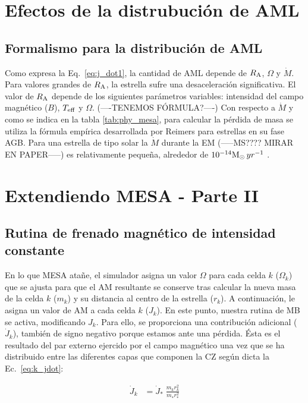 \section{Efectos de la distrubución de AML}
\subsection{Formalismo para la distribución de AML} \label{mod_aml}
Como expresa la Eq.~\ref{eq:j_dot1}, la cantidad de AML depende de $R_{\mathrm{A}}$, $\Omega$ y $\Dot{M}$. Para valores grandes de $R_{\mathrm{A}}$, la estrella sufre una desaceleración significativa. El valor de $R_{\mathrm{A}}$ depende de los siguientes parámetros variables: intensidad del campo magnético ($B$), $T_{\mathrm{eff}}$ y $\Omega$. (----TENEMOS FÓRMULA?----) Con respecto a $\Dot{M}$ y como se indica en la tabla \ref{tab:phy_mesa}, para calcular la pérdida de masa se utiliza la fórmula empírica desarrollada por Reimers \citep{Reimers1975} para estrellas en su fase AGB. Para una estrella de tipo solar la $\Dot{M}$ durante la EM (-----MS???? MIRAR EN PAPER-----) es relativamente pequeña, alrededor de $10^{-14}\mathrm{M}_\odot \, yr^{-1}$ \citep{Noerdlinger2008}. \par


\section{Extendiendo MESA - Parte II}

\subsection{Rutina de frenado magnético de intensidad constante} \label{sec:mb_cte_b}
En lo que MESA atañe, el simulador asigna un valor $\Omega$ para cada celda $k$ ($\Omega_k$) que se ajusta para que el AM resultante se conserve tras calcular la nueva masa de la celda $k$ ($m_k$) y su distancia al centro de la estrella ($r_k$). A continuación, le asigna un valor de AM a cada celda $k$ ($J_k$). En este punto, nuestra rutina de MB se activa, modificando $J_k$. Para ello, se proporciona una contribución adicional ($\Dot{J}_{k}$), también de signo negativo porque estamos ante una pérdida. Ésta es el resultado del par externo ejercido por el campo magnético una vez que se ha distribuido entre las diferentes capas que componen la CZ según dicta la Ec.~\ref{eq:k_jdot}:\par

\begin{align}
	\Dot{J}_{k} &= \Dot{J}_*\;\frac{m^{}_{k} r^2_{k}}{m^{}_* r_*^2} \label{eq:k_jdot}
\end{align}



